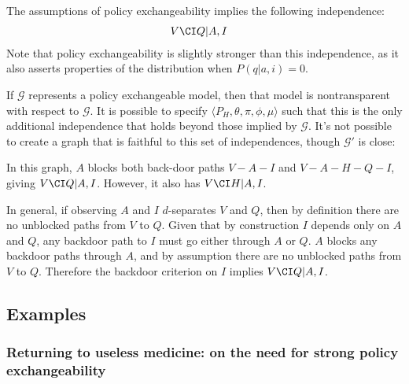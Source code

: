 The assumptions of policy exchangeability implies the following independence:
\begin{align}
    V&\CI Q|A,I
\end{align}
Note that policy exchangeability is slightly stronger than this independence, as it also asserts properties of the distribution when $P(q|a,i)=0$.

If $\mathcal{G}$ represents a policy exchangeable model, then that model is nontransparent with respect to $\mathcal{G}$. It is possible to specify $\langle P_H, \theta,\pi,\phi,\mu\rangle$ such that this is the only additional independence that holds beyond those implied by $\mathcal{G}$. It's not possible to create a graph that is faithful to this set of independences, though $\mathcal{G}'$ is close:

\begin{center}
\end{center}

In this graph, $A$ blocks both back-door paths $V-A-I$ and $V-A-H-Q-I$, giving $V\CI Q|A,I$. However, it also has $V\CI H|A,I$.

In general, if observing $A$ and $I$ $d$-separates $V$ and $Q$, then by definition there are no unblocked paths from $V$ to $Q$. Given that by construction $I$ depends only on $A$ and $Q$, any backdoor path to $I$ must go either through $A$ or $Q$. $A$ blocks any backdoor paths through $A$, and by assumption there are no unblocked paths from $V$ to $Q$. Therefore the backdoor criterion on $I$ implies $V\CI Q|A,I$.


\subsection{Examples}

\subsubsection{Returning to useless medicine: on the need for strong policy exchangeability}

